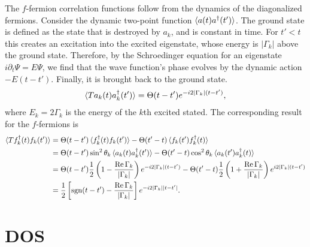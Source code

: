 \documentclass[aps,pra,preprint,groupedaddress]{revtex4-1}
\DeclareMathOperator{\sgn}{sgn}
\DeclareMathOperator{\re}{Re}
\newcommand{\1}{\mathds{1}}
\begin{document}
The $f$-fermion correlation functions follow from the dynamics of the diagonalized fermions. Consider the dynamic two-point function $\braket{a(t) a^\dagger(t')}$. The ground state is defined as the state that is destroyed by $a_k$, and is constant in time. For $t'<t$ this creates an excitation into the excited eigenstate, whose energy is $|\Gamma_k|$ above the ground state. Therefore, by the Schroedinger equation for an eigenstate $i \partial_t \Psi = E \Psi$, we find that the wave function's phase evolves by the dynamic action $-E (t-t')$. Finally, it is brought back to the ground state.
\begin{align}
\braket{T a_k(t) a_k^\dagger(t')} = \Theta(t-t') e^{-i 2 |\Gamma_k| (t-t')},
\end{align}
where $E_k = 2 \Gamma_k$ is the energy of the $k$th excited stated.
The corresponding result for the $f$-fermions is
\begin{align}\label{g_k}
\braket{T f_k^\dagger(t) f_k(t')} &= \Theta(t-t') \braket{ f_k^\dagger(t) f_k(t')} - \Theta(t'-t) \braket{f_k(t') f_k^\dagger(t)} \nonumber \\
&= \Theta(t-t') \sin^2\theta_k \braket{ a_k(t) a_k^\dagger(t')} - \Theta(t'-t) \cos^2{\theta_k} \braket{ a_k(t') a_k^\dagger(t)} \nonumber \\
&= \Theta(t-t') \frac{1}{2}\left(1-\frac{\re \Gamma_k}{|\Gamma_k|}\right) e^{-i 2 |\Gamma_k| (t-t')} - \Theta(t'-t) \frac{1}{2}\left(1+\frac{\re \Gamma_k}{|\Gamma_k|}\right) e^{i 2 |\Gamma_k| (t-t')} \nonumber\\
&= \frac{1}{2} \left[\sgn(t-t')-\frac{\re \Gamma_k}{|\Gamma_k|}\right]e^{-i 2 |\Gamma_k| |t-t'|}.
\end{align}


\section{DOS} \label{app:DOS}
\end{document}
